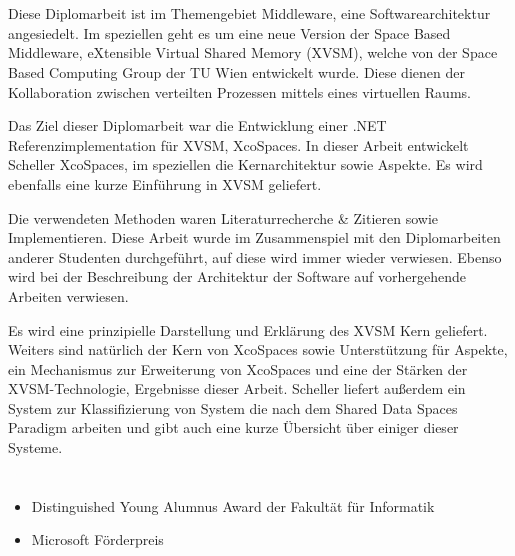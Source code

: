 %
\section*{\thesisheading} %


Diese Diplomarbeit ist im Themengebiet Middleware, eine Softwarearchitektur angesiedelt. Im speziellen geht es um eine neue Version der Space Based Middleware, eXtensible Virtual Shared Memory (XVSM), welche von der Space Based Computing Group der TU Wien entwickelt wurde. Diese dienen der Kollaboration zwischen verteilten Prozessen mittels eines virtuellen Raums.

Das Ziel dieser Diplomarbeit war die Entwicklung einer .NET Referenzimplementation für XVSM, XcoSpaces. In dieser Arbeit entwickelt Scheller XcoSpaces, im speziellen die Kernarchitektur sowie Aspekte. Es wird ebenfalls eine kurze Einführung in XVSM geliefert.

Die verwendeten Methoden waren Literaturrecherche \& Zitieren sowie Implementieren. Diese Arbeit wurde im Zusammenspiel mit den Diplomarbeiten anderer Studenten durchgeführt, auf diese wird immer wieder verwiesen. Ebenso wird bei der Beschreibung der Architektur der Software auf vorhergehende Arbeiten verwiesen.

Es wird eine prinzipielle Darstellung und Erklärung des XVSM Kern geliefert. Weiters sind natürlich der Kern von XcoSpaces sowie Unterstützung für Aspekte, ein Mechanismus zur Erweiterung von XcoSpaces und eine der Stärken der XVSM-Technologie, Ergebnisse dieser Arbeit. Scheller liefert außerdem ein System zur Klassifizierung von System die nach dem Shared Data Spaces Paradigm arbeiten und gibt auch eine kurze Übersicht über einiger dieser Systeme.

%
\section*{\thesisheading} %

\begin{itemize}
\item Distinguished Young Alumnus Award der Fakultät für Informatik
\item Microsoft Förderpreis
\end{itemize}

